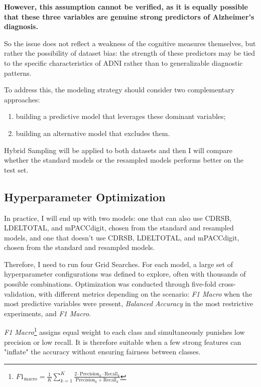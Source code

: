 \textbf{However, this assumption cannot be verified, as it is equally possible that these three variables are genuine strong predictors of Alzheimer’s diagnosis.}

So the issue does not reflect a weakness of the cognitive measures themselves, but rather the possibility of dataset bias: the strength of these predictors may be tied to the specific characteristics of ADNI rather than to generalizable diagnostic patterns. 

To address this, the modeling strategy should consider two complementary approaches:
\begin{enumerate}
	\item building a predictive model that leverages these dominant variables;
	\item building an alternative model that excludes them.
\end{enumerate}

Hybrid Sampling will be applied to both datasets and then I will compare whether the standard models or the resampled models performs better on the test set. 

\subsection{Hyperparameter Optimization}
In practice, I will end up with two models: one that can also use CDRSB, LDELTOTAL, and mPACCdigit, chosen from the standard and resampled models, and one that doesn't use CDRSB, LDELTOTAL, and mPACCdigit, chosen from the standard and resampled models.

\vspace{2mm}

Therefore, I need to run four Grid Searches. For each model, a large set of hyperparameter configurations was defined to explore, often with thousands of possible combinations. Optimization was conducted through five-fold cross-validation, with different metrics depending on the scenario: \textit{F1 Macro} when the most predictive variables were present, \textit{Balanced Accuracy} in the most restrictive experiments, and \textit{F1 Macro}.

\vspace{2mm} 

\textit{F1 Macro}\footnote{$F1_{\text{macro}} = \frac{1}{K} \sum_{k=1}^{K} \frac{2 \cdot \text{Precision}_k \cdot \text{Recall}_k} {\text{Precision}_k + \text{Recall}_k}$} assigns equal weight to each class and simultaneously punishes low precision or low recall. It is therefore suitable when a few strong features can "inflate" the accuracy without ensuring fairness between classes.

